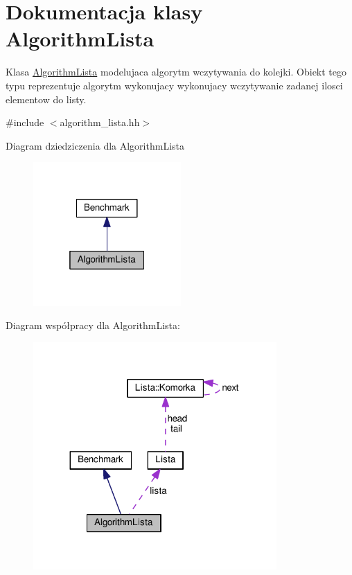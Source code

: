 \hypertarget{class_algorithm_lista}{\section{Dokumentacja klasy Algorithm\-Lista}
\label{class_algorithm_lista}
}


Klasa \hyperlink{class_algorithm_lista}{Algorithm\-Lista} modelujaca algorytm wczytywania do kolejki. Obiekt tego typu reprezentuje algorytm wykonujacy wykonujacy wczytywanie zadanej ilosci elementow do listy.  




{\ttfamily \#include $<$algorithm\-\_\-lista.\-hh$>$}



Diagram dziedziczenia dla Algorithm\-Lista\nopagebreak
\begin{figure}[H]
\begin{center}
\leavevmode
\includegraphics[width=160pt]{class_algorithm_lista__inherit__graph}
\end{center}
\end{figure}


Diagram współpracy dla Algorithm\-Lista\-:\nopagebreak
\begin{figure}[H]
\begin{center}
\leavevmode
\includegraphics[width=263pt]{class_algorithm_lista__coll__graph}
\end{center}
\end{figure}
